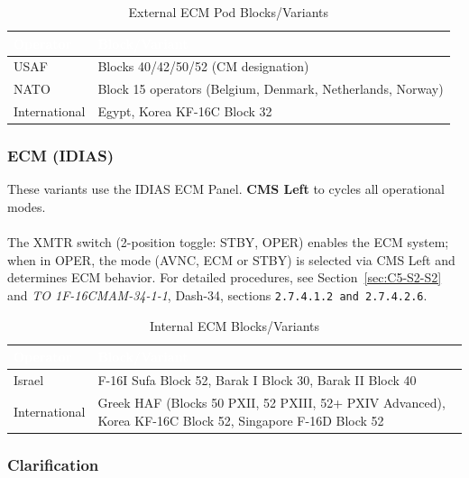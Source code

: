 \documentclass[11pt, a4paper, twoside]{report}
\providecommand{\dashrefs}[1]{\textit{TO 1F-16CMAM-34-1-1}, Dash-34, sections \texttt{#1}}
\begin{document}
\begin{table}[h]
\centering
\caption{External ECM Pod Blocks/Variants}
\label{tab:C5-S3-external-ecm-pods}
\small
\renewcommand{\arraystretch}{1.25}
\begin{tabular}{|>{\raggedright\arraybackslash}p{3.0cm}|>{\raggedright\arraybackslash}p{5.8cm}|}
\hline
\rowcolor{headerblue}
\textcolor{white}{\textbf{Operator}} & \textcolor{white}{\textbf{Block/Variant}} \\
\hline
USAF & Blocks 40/42/50/52 (CM designation) \\
\hline
NATO & Block 15 operators (Belgium, Denmark, Netherlands, Norway) \\
\hline
International & Egypt, Korea KF-16C Block 32 \\
\hline
\end{tabular}
\end{table}

\subsubsection{ECM (IDIAS)}
\label{sec:C5-S3-S1-S2}

These variants use the IDIAS ECM Panel. \textbf{CMS Left} to cycles all operational modes.\\\\
The XMTR switch (2-position toggle: STBY, OPER) enables the ECM system; when in OPER, the mode (AVNC, ECM or STBY) is selected via CMS Left and determines ECM behavior. For detailed procedures, see Section~\ref{sec:C5-S2-S2} and \dashrefs{2.7.4.1.2 and 2.7.4.2.6}.
\begin{table}[h]
\centering
\caption{Internal ECM Blocks/Variants}
\label{tab:C5-S3-internal-ecm}
\small
\renewcommand{\arraystretch}{1.25}
\begin{tabular}{|>{\raggedright\arraybackslash}p{3.0cm}|>{\raggedright\arraybackslash}p{5.8cm}|}
\hline
\rowcolor{headerblue}
\textcolor{white}{\textbf{Operator}} & \textcolor{white}{\textbf{Block/Variant}} \\
\hline
Israel & F-16I Sufa Block 52, Barak I Block 30, Barak II Block 40 \\
\hline
International & Greek HAF (Blocks 50 PXII, 52 PXIII, 52+ PXIV Advanced), Korea KF-16C Block 52, Singapore F-16D Block 52 \\
\hline
\end{tabular}
\end{table}

\subsubsection{Clarification}
\label{sec:C5-S3-S1-S3}
\end{document}
